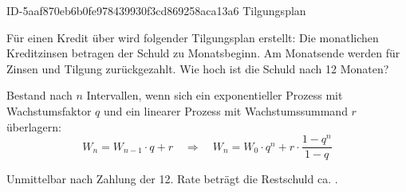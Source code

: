 \begin{exercise}
      {ID-5aaf870eb6b0fe978439930f3cd869258aca13a6}
      {Tilgungsplan}
  \ifproblem\problem\par
    Für einen Kredit über  wird folgender Tilgungsplan
    erstellt: Die monatlichen Kreditzinsen betragen 
    der Schuld zu Monatsbeginn. Am Monatsende werden 
    für Zinsen und Tilgung zurückgezahlt. Wie hoch ist die
    Schuld nach \num{12} Monaten?
  \fi
  \ifoutline\outline\par
    Bestand nach $n$ Intervallen, wenn sich ein exponentieller Prozess mit
    Wachstumsfaktor $q$ und ein linearer Prozess mit Wachstumssummand $r$
    überlagern:
    \begin{equation*}
      W_{n}=W_{n-1}\cdot q+r
      \quad\Rightarrow\quad
      W_{n}=W_{0}\cdot q^{n}+r\cdot\frac{1-q^n}{1-q}
    \end{equation*}
  \fi
  \ifoutcome\outcome\par
    Unmittelbar nach Zahlung der 12. Rate beträgt die
    Restschuld ca. .
  \fi
\end{exercise}
